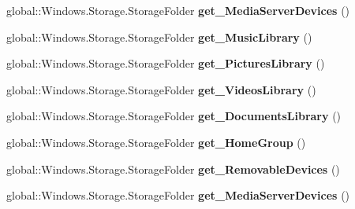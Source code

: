 \begin{DoxyCompactItemize}
global\+::\+Windows.\+Storage.\+Storage\+Folder {\bfseries get\+\_\+\+Media\+Server\+Devices} ()
\item 
\mbox{\label{interface_windows_1_1_storage_1_1_i_known_folders_statics_adcd49c72e55a38fd059c899befb787e3}} 
global\+::\+Windows.\+Storage.\+Storage\+Folder {\bfseries get\+\_\+\+Music\+Library} ()
\item 
\mbox{\label{interface_windows_1_1_storage_1_1_i_known_folders_statics_a9b9ec6853cba04e273a03844185f6a2a}} 
global\+::\+Windows.\+Storage.\+Storage\+Folder {\bfseries get\+\_\+\+Pictures\+Library} ()
\item 
\mbox{\label{interface_windows_1_1_storage_1_1_i_known_folders_statics_a4e094bf4626dc4a6a6cabddd24d74062}} 
global\+::\+Windows.\+Storage.\+Storage\+Folder {\bfseries get\+\_\+\+Videos\+Library} ()
\item 
\mbox{\label{interface_windows_1_1_storage_1_1_i_known_folders_statics_a13665295b51c3f4818fa4670e5c6a652}} 
global\+::\+Windows.\+Storage.\+Storage\+Folder {\bfseries get\+\_\+\+Documents\+Library} ()
\item 
\mbox{\label{interface_windows_1_1_storage_1_1_i_known_folders_statics_a3873e49e2ba9b30c2e9454dc846f4fdd}} 
global\+::\+Windows.\+Storage.\+Storage\+Folder {\bfseries get\+\_\+\+Home\+Group} ()
\item 
\mbox{\label{interface_windows_1_1_storage_1_1_i_known_folders_statics_a82d93b3f375e9c0c78a55429b4bb9b4b}} 
global\+::\+Windows.\+Storage.\+Storage\+Folder {\bfseries get\+\_\+\+Removable\+Devices} ()
\item 
\mbox{\label{interface_windows_1_1_storage_1_1_i_known_folders_statics_af7ac66278db4629c0fb06db6a4c43813}} 
global\+::\+Windows.\+Storage.\+Storage\+Folder {\bfseries get\+\_\+\+Media\+Server\+Devices} ()
\item 

\end{DoxyCompactItemize}
